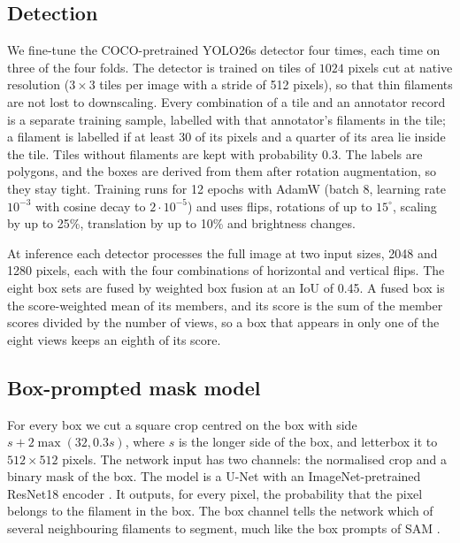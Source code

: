 \documentclass[sigconf,nonacm]{acmart}
\begin{document}
\subsection{Detection}\label{sec:detection}
    We fine-tune the COCO-pretrained YOLO26s detector \cite{ultralytics} four times, each time on three of the four folds. The detector is trained on tiles of $1024$ pixels cut at native resolution ($3\times3$ tiles per image with a stride of 512 pixels), so that thin filaments are not lost to downscaling. Every combination of a tile and an annotator record is a separate training sample, labelled with that annotator's filaments in the tile; a filament is labelled if at least 30 of its pixels and a quarter of its area lie inside the tile. Tiles without filaments are kept with probability 0.3. The labels are polygons, and the boxes are derived from them after rotation augmentation, so they stay tight. Training runs for 12 epochs with AdamW (batch 8, learning rate $10^{-3}$ with cosine decay to $2\cdot10^{-5}$) and uses flips, rotations of up to $15^\circ$, scaling by up to 25\%, translation by up to 10\% and brightness changes.

    At inference each detector processes the full image at two input sizes, 2048 and 1280 pixels, each with the four combinations of horizontal and vertical flips. The eight box sets are fused by weighted box fusion \cite{solovyev2021wbf} at an IoU of 0.45. A fused box is the score-weighted mean of its members, and its score is the sum of the member scores divided by the number of views, so a box that appears in only one of the eight views keeps an eighth of its score.

\subsection{Box-prompted mask model}
    For every box we cut a square crop centred on the box with side $s + 2\max(32, 0.3s)$, where $s$ is the longer side of the box, and letterbox it to $512\times512$ pixels. The network input has two channels: the normalised crop and a binary mask of the box. The model is a U-Net \cite{ronneberger2015unet} with an ImageNet-pretrained ResNet18 encoder \cite{he2016resnet,iakubovskii2019smp}. It outputs, for every pixel, the probability that the pixel belongs to the filament in the box. The box channel tells the network which of several neighbouring filaments to segment, much like the box prompts of SAM \cite{kirillov2023sam}.
\end{document}
